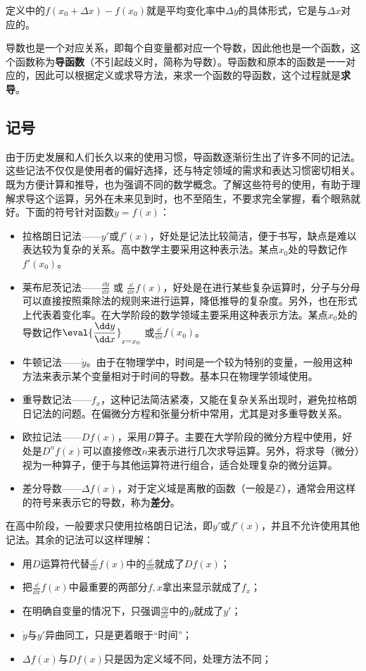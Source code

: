 定义中的$f(x_0+\Delta x)-f(x_0)$就是平均变化率中$\Delta y$的具体形式，它是与$\Delta x$对应的。

导数也是一个对应关系，即每个自变量都对应一个导数，因此他也是一个函数，这个函数称为\textbf{导函数}（不引起歧义时，简称为导数）。导函数和原本的函数是一一对应的，因此可以根据定义或求导方法，来求一个函数的导函数，这个过程就是\textbf{求导}。

\subsection{记号}
由于历史发展和人们长久以来的使用习惯，导函数逐渐衍生出了许多不同的记法。这些记法不仅仅是使用者的偏好选择，还与特定领域的需求和表达习惯密切相关。既为方便计算和推导，也为强调不同的数学概念。了解这些符号的使用，有助于理解求导这个运算，另外在未来见到时，也不至陌生，不要求完全掌握，看个眼熟就好。下面的符号针对函数$y=f(x)$：
\begin{itemize}
\item 拉格朗日记法——$y'$或$f'(x)$，好处是记法比较简洁，便于书写，缺点是难以表达较为复杂的关系。高中数学主要采用这种表示法。某点$x_0$处的导数记作$f'(x_0)$。
\item 莱布尼茨记法——$\displaystyle\frac{\dd y}{\dd x}$  或  $\displaystyle\frac{\dd}{\dd x}f(x)$，好处是在进行某些复杂运算时，分子与分母可以直接按照乘除法的规则来进行运算，降低推导的复杂度。另外，也在形式上代表着变化率。在大学阶段的数学领域主要采用这种表示方法。某点$x_0$处的导数记作$\displaystyle\eval{\dfrac{\dd y}{\dd x}}_{x=x_0}$ 或$\displaystyle\frac{\dd}{\dd x}f(x_0)$。
\item 牛顿记法——$\dot{y}$。由于在物理学中，时间是一个较为特别的变量，一般用这种方法来表示某个变量相对于时间的导数。基本只在物理学领域使用。
\item 重导数记法——$f_x$，这种记法简洁紧凑，又能在复杂关系出现时，避免拉格朗日记法的问题。在偏微分方程和张量分析中常用，尤其是对多重导数关系。
\item 欧拉记法——$Df(x)$，采用$D$算子。主要在大学阶段的微分方程中使用，好处是$D^n f(x)$可以直接修改$n$来表示进行几次求导运算。另外，将求导（微分）视为一种算子，便于与其他运算符进行组合，适合处理复杂的微分运算。
\item 差分导数——$\Delta f(x)$，对于定义域是离散的函数（一般是$\mathbb{Z}$），通常会用这样的符号来表示它的导数，称为\textbf{差分}。
\end{itemize}

在高中阶段，一般要求只使用拉格朗日记法，即$y'$或$f'(x)$，并且不允许使用其他记法。其余的记法可以这样理解：
\begin{itemize}
\item 用$D$运算符代替$\displaystyle\frac{\dd}{\dd x}f(x)$中的$\displaystyle\frac{\dd}{\dd x}$就成了$Df(x)$；
\item 把$\displaystyle\frac{\dd}{\dd x}f(x)$中最重要的两部分$f,x$拿出来显示就成了$f_x$；
\item 在明确自变量的情况下，只强调$\displaystyle\frac{\dd y}{\dd x}$中的$y$就成了$y'$；
\item $\dot{y}$与$y'$异曲同工，只是更着眼于“时间”；
\item $\Delta f(x)$与$Df(x)$只是因为定义域不同，处理方法不同；
\end{itemize}

